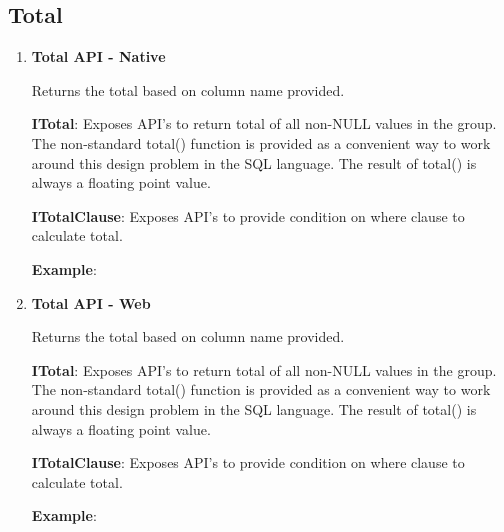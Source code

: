 	\subsection{Total} 

		\begin{enumerate}

			\item \small \textbf{Total API - Native}
				\par 
				Returns the total based on column name provided.
				
		
				\textbf{ITotal}:     Exposes API's to return total of all non-NULL values in the group.
 						The non-standard total() function is provided as a convenient way to work around this design problem in the SQL language.
						The result of total() is always a floating point value.

	
					

			
				\textbf{ITotalClause}: Exposes API's to provide condition on where clause to calculate total.
					

				\textbf{Example}: 
					


			\item \small \textbf{Total API - Web}
				\par 
				Returns the total based on column name provided.
				
		
				\textbf{ITotal}:     Exposes API's to return total of all non-NULL values in the group.
 						The non-standard total() function is provided as a convenient way to work around this design problem in the SQL language.
						The result of total() is always a floating point value.

	
					

			
				\textbf{ITotalClause}: Exposes API's to provide condition on where clause to calculate total.
					

				\textbf{Example}: 
					

		\end{enumerate}




